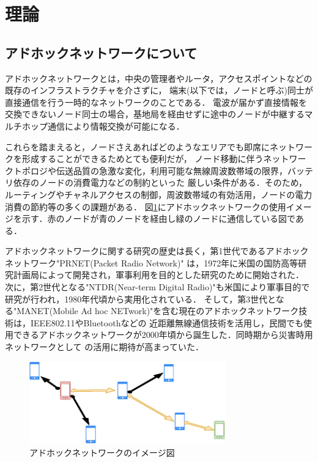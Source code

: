 \documentclass[a4paper, 11pt]{ltjsarticle}
\begin{document}
\clearpage
\section{理論}
\subsection{アドホックネットワークについて} \label{about_ad-hoc}
アドホックネットワークとは，中央の管理者やルータ，アクセスポイントなどの既存のインフラストラクチャを介さずに，
端末(以下では，ノードと呼ぶ)同士が直接通信を行う一時的なネットワークのことである．
電波が届かず直接情報を交換できないノード同士の場合，基地局を経由せずに途中のノードが中継するマルチホップ通信により情報交換が可能になる．

これらを踏まえると，ノードさえあればどのようなエリアでも即席にネットワークを形成することができるためとても便利だが，
ノード移動に伴うネットワークトポロジや伝送品質の急激な変化，利用可能な無線周波数帯域の限界，バッテリ依存のノードの消費電力などの制約といった
厳しい条件がある．そのため，ルーティングやチャネルアクセスの制御，周波数帯域の有効活用，ノードの電力消費の節約等の多くの課題がある\cite{間瀬憲一2001アドホックネットワーク}．
図\ref{ad-hoc_model}にアドホックネットワークの使用イメージを示す．赤のノードが青のノードを経由し緑のノードに通信している図である．

アドホックネットワークに関する研究の歴史は長く，第1世代であるアドホックネットワーク"PRNET(Packet Radio Network)"
は，1972年に米国の国防高等研究計画局によって開発され，軍事利用を目的とした研究のために開始された．
次に，第2世代となる"NTDR(Near-term Digital Radio)"も米国により軍事目的で研究が行われ，1980年代頃から実用化されている．
そして，第3世代となる"MANET(Mobile Ad hoc NETwork)"を含む現在のアドホックネットワーク技術は，IEEE802.11やBluetoothなどの
近距離無線通信技術を活用し，民間でも使用できるアドホックネットワークが2000年頃から誕生した．同時期から災害時用ネットワークとして
の活用に期待が高まっていた．

\begin{figure}[H]
  \centering
  \includegraphics[width=85mm]{ad-hoc_model.pdf}
  \caption{アドホックネットワークのイメージ図}
  \label{ad-hoc_model}
\end{figure}
\end{document}
